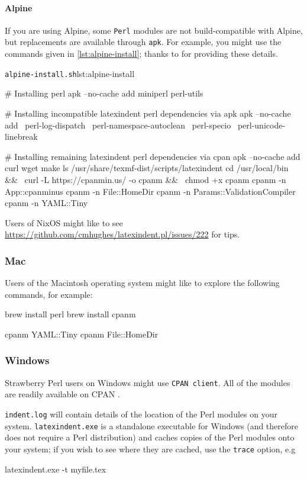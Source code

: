 		\paragraph{Alpine}
			If you are using Alpine, some \texttt{Perl} modules are not build-compatible with Alpine,
			but replacements are available through \texttt{apk}. For example, you might use the
			commands given in \cref{lst:alpine-install}; thanks to \cite{jun-sheaf} for providing
			these details.

			\begin{cmhlistings}[style=tcblatex,language=Bash]{\texttt{alpine-install.sh}}{lst:alpine-install}
		
# Installing perl
apk --no-cache add miniperl perl-utils

# Installing incompatible latexindent perl dependencies via apk
apk --no-cache add \
    perl-log-dispatch \
    perl-namespace-autoclean \
    perl-specio \
    perl-unicode-linebreak

# Installing remaining latexindent perl dependencies via cpan
apk --no-cache add curl wget make
ls /usr/share/texmf-dist/scripts/latexindent
cd /usr/local/bin && \
    curl -L https://cpanmin.us/ -o cpanm && \
    chmod +x cpanm
cpanm -n App::cpanminus
cpanm -n File::HomeDir
cpanm -n Params::ValidationCompiler
cpanm -n YAML::Tiny
\end{cmhlistings}

			Users of NixOS might like to see
			\href{https://github.com/cmhughes/latexindent.pl/issues/222}{https://github.com/cmhughes/latexindent.pl/issues/222}
			for tips.
	\subsubsection{Mac}
		Users of the Macintosh operating system might like to explore the following commands, for
		example:
		\begin{commandshell}
brew install perl
brew install cpanm

cpanm YAML::Tiny
cpanm File::HomeDir
\end{commandshell}

	\subsubsection{Windows}
		Strawberry Perl users on Windows might use \texttt{CPAN client}. All of the modules are
		readily available on CPAN \cite{cpan}.

		\texttt{indent.log} will contain details of the location
		of the Perl modules on your system. \texttt{latexindent.exe} is a standalone executable
		for Windows (and therefore does not require a Perl distribution) and caches copies of the
		Perl modules onto your system; if you wish to see where they are cached, use the
		\texttt{trace} option, e.g
		\begin{dosprompt}
latexindent.exe -t myfile.tex
 \end{dosprompt}

